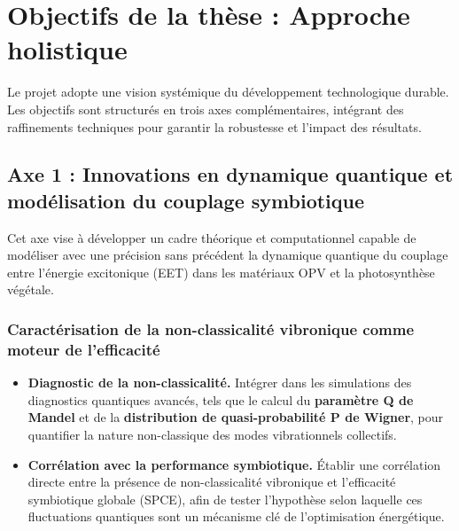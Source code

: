 \documentclass[12pt, a4paper]{article}
\begin{document}
\section{Objectifs de la thèse : Approche holistique}

Le projet adopte une vision systémique du développement technologique durable. Les objectifs sont structurés en trois axes complémentaires, intégrant des raffinements techniques pour garantir la robustesse et l'impact des résultats.

\subsection{Axe 1 : Innovations en dynamique quantique et modélisation du couplage symbiotique}

Cet axe vise à développer un cadre théorique et computationnel capable de modéliser avec une précision sans précédent la dynamique quantique du couplage entre l'énergie excitonique (EET) dans les matériaux OPV et la photosynthèse végétale.

\subsubsection{Caractérisation de la non-classicalité vibronique comme moteur de l'efficacité}
\begin{itemize}
    \item \textbf{Diagnostic de la non-classicalité.} Intégrer dans les simulations des diagnostics quantiques avancés, tels que le calcul du \textbf{paramètre Q de Mandel} et de la \textbf{distribution de quasi-probabilité P de Wigner}, pour quantifier la nature non-classique des modes vibrationnels collectifs.
    \item \textbf{Corrélation avec la performance symbiotique.} Établir une corrélation directe entre la présence de non-classicalité vibronique et l'efficacité symbiotique globale (SPCE), afin de tester l'hypothèse selon laquelle ces fluctuations quantiques sont un mécanisme clé de l'optimisation énergétique.
\end{itemize}
\end{document}
